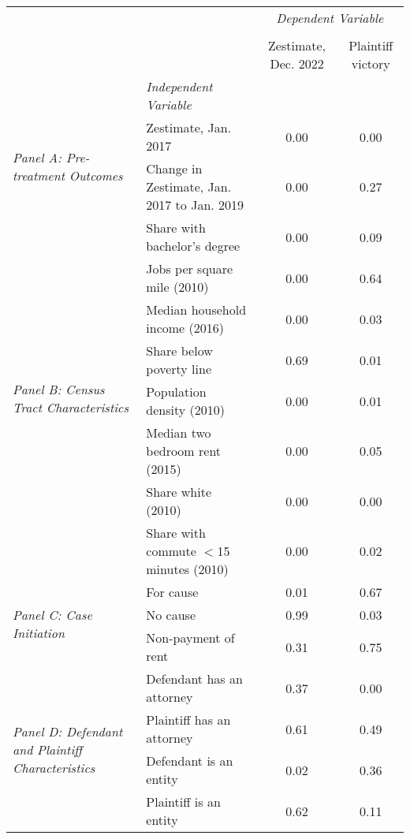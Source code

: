 \begin{tabular}{llcc}
\toprule
 &  & \multicolumn{2}{c}{\textit{Dependent Variable}} \\
\cline{3-4}
\\
 &  & Zestimate, Dec. 2022 & Plaintiff victory \\
 & \emph{Independent Variable} &  &  \\
\midrule
\multirow[c]{2}{3cm}{\textit{Panel A: Pre-treatment Outcomes}} & Zestimate, Jan. 2017 & 0.00 & 0.00 \\
 & Change in Zestimate, Jan. 2017 to Jan. 2019 & 0.00 & 0.27 \\
\cline{1-4}
\multirow[c]{8}{3cm}{\textit{Panel B: Census Tract Characteristics}} & Share with bachelor's degree & 0.00 & 0.09 \\
 & Jobs per square mile (2010) & 0.00 & 0.64 \\
 & Median household income (2016) & 0.00 & 0.03 \\
 & Share below poverty line & 0.69 & 0.01 \\
 & Population density (2010) & 0.00 & 0.01 \\
 & Median two bedroom rent (2015) & 0.00 & 0.05 \\
 & Share white (2010) & 0.00 & 0.00 \\
 & Share with commute $<$15 minutes (2010) & 0.00 & 0.02 \\
\cline{1-4}
\multirow[c]{3}{3cm}{\textit{Panel C: Case Initiation}} & For cause & 0.01 & 0.67 \\
 & No cause & 0.99 & 0.03 \\
 & Non-payment of rent & 0.31 & 0.75 \\
\cline{1-4}
\multirow[c]{4}{3cm}{\textit{Panel D: Defendant and Plaintiff Characteristics}} & Defendant has an attorney & 0.37 & 0.00 \\
 & Plaintiff has an attorney & 0.61 & 0.49 \\
 & Defendant is an entity & 0.02 & 0.36 \\
 & Plaintiff is an entity & 0.62 & 0.11 \\
\cline{1-4}
\bottomrule
\end{tabular}
